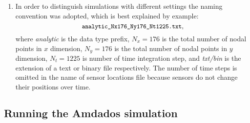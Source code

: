 \documentclass[]{article}
\begin{document}
\begin{enumerate}
    \begin{itemize}
    \item Text file of sensor locations: ``\textit{sensors*.txt}'';
    \item Text file of \textit{observations} at sensor locations: ``\textit{analytic*.txt}''.
    \end{itemize}
    The first of these files is generated by \texttt{Amdados} application running in
    special scenario\footnote{Sensors generation by Python is too slow, so we use C++ implementation instead.}, e.g.:
    $$
    \mbox{\small\texttt{build/app/amdados --scenario sensors --config config-file-name}}
    $$
    For convenience, if a file of sensor locations was not found in the output directory\footnote{Parameter \textit{output\_dir} in configuration file.} upon launching the script \texttt{python/ObservationsGenerator.py}, the \texttt{Amdados} application will be automatically run in aforementioned scenario to generate sensors (pseudo) randomly seeded inside the domain.
\item In order to distinguish simulations with different settings the naming convention was adopted, which is best explained by example:
$$
\mbox{\small\texttt{analytic\_Nx176\_Ny176\_Nt1225.txt}},
$$
where \textit{analytic} is the \textsf{data type prefix}, $N_x=176$ is the total number of nodal points in $x$ dimension, $N_y=176$ is the total number of nodal points in $y$ dimension, $N_t=1225$ is number of time integration step, and \textit{txt/bin} is the extension of a text or binary file respectively. The number of time steps is omitted in the name of sensor locations file because sensors do not change their positions over time.
\end{enumerate}

\subsection{Running the Amdados simulation}
\end{document}
